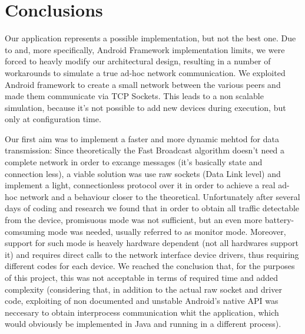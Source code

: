 \section{Conclusions}
	Our application represents a possible implementation, but not the best one. Due to \direct and, more specifically, Android \direct Framework implementation limits, we were forced to heavly modify our architectural design, resulting in a number of workarounds to simulate a true ad-hoc network communication. We exploited Android \direct framework to create a small network between the various peers and made them communicate via TCP Sockets. This leads to a non scalable simulation, because it's not possible to add new devices during execution, but only at configuration time.
	
	Our first aim was to implement a faster and more dynamic mehtod for data transmission: Since theoretically the Fast Broadcast algorithm doesn't need a complete network in order to excange messages (it's basically state and connection less), a viable solution was use raw sockets (Data Link level) and implement a light, connectionless protocol over it in order to achieve a real ad-hoc network and a behaviour closer to the theoretical. Unfortunately after several days of coding and research we found that in order to obtain all traffic detectable from the device, promisuous mode was not sufficient, but an even more battery-comsuming mode was needed, usually referred to as monitor mode. Moreover, support for such mode is heavely hardware dependent (not all hardwares support it) and requires direct calls to the network interface device drivers, thus requiring different codes for each device. We reached the conclusion that, for the purposes of this project, this was not acceptable in terms of required time and added complexity (considering that, in addition to the actual raw socket and driver code, exploiting of non documented and unstable Android's native API was neccesary to obtain interprocess communication whit the application, which would obviously be implemented in Java and running in a different process).
